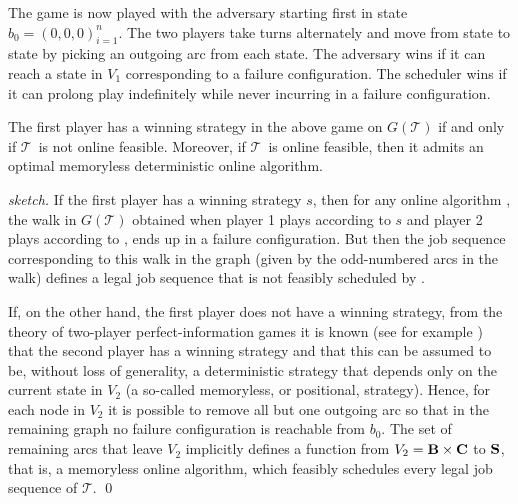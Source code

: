 \documentclass{llncs}
\newcommand{\tsys}{\ensuremath{\mathcal{T}}}
\newcommand{\backlog}{\ensuremath{\mathbf{B}}}
\begin{document}
The game is now played with the adversary starting first in state $b_0=(0,0,0)_{i=1}^n$. The two players take turns alternately and move from state to state by picking an outgoing arc from each state. The adversary wins if it can reach a state in $V_1$ corresponding to a failure configuration. The scheduler wins if it can prolong play indefinitely while never incurring in a failure configuration. 
\begin{lemma}
\label{lem:onlinefeas}
The first player has a winning strategy in the above game on $G(\tsys)$ if and only if \tsys\ is not online feasible. Moreover, if \tsys\ is online feasible, then it admits an optimal memoryless deterministic online algorithm. 
\end{lemma}
\begin{proof}[sketch]
If the first player has a winning strategy $s$, then for any online algorithm \alg, the walk in $G(\tsys)$ obtained when player 1 plays according to $s$ and player 2 plays according to \alg, ends up in a failure configuration. But then the job sequence corresponding to this walk in the graph (given by the odd-numbered arcs in the walk) defines a legal job sequence that is not feasibly scheduled by \alg. 

If, on the other hand, the first player does not have a winning strategy, from the theory of two-player perfect-information games it is known (see for example \cite{Graedel:2002,McNaughton:1993}) that the second player has a winning strategy and that this can be assumed to be, without loss of generality, a deterministic strategy that depends only on the current state in $V_2$ (a so-called memoryless, or positional, strategy). Hence, for each node in $V_2$ it is possible to remove all but one outgoing arc so that in the remaining graph no failure configuration is reachable from $b_0$. The set of remaining arcs that leave $V_2$ implicitly defines a function from $V_2=\backlog \times \rct$ to $\mathbf{S}$, that is, a memoryless online algorithm, which feasibly schedules every legal job sequence of \tsys.
\qed  
\end{proof}
\end{document}
